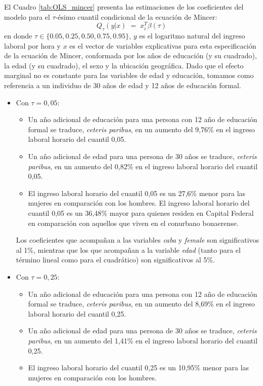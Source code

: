 \documentclass[11pt]{article}
\begin{document}
El Cuadro \ref{tab:OLS_mincer} presenta las estimaciones de los coeficientes del modelo para el $\tau$-ésimo cuantil condicional de la ecuación de Mincer:
\[
Q_{\tau}(y|x)\;=\;x_{i}^{T}\beta(\tau)
\]
en donde $\tau\in\{0.05,0.25,0.50,0.75,0.95\}$, $y$ es el logaritmo natural del ingreso laboral por hora y $x$ es el vector de variables explicativas para esta especificación de la ecuación de Mincer, conformada por los años de educación (y su cuadrado), la edad (y su cuadrado), el sexo y la ubicación geográfica. Dado que el efecto marginal no es constante para las variables de edad y educación, tomamos como referencia a un individuo de 30 años de edad y 12 años de educación formal.
\begin{itemize}
    \item Con $\tau=0,05$:
    \begin{itemize}
        \item Un año adicional de educación para una persona con 12 año de educación formal se traduce, \emph{ceteris paribus}, en un aumento del 9,76\% en el ingreso laboral horario del cuantil 0,05.
        \item Un año adicional de edad para una persona de 30 años se traduce, \emph{ceteris paribus}, en un aumento del 0,82\% en el ingreso laboral horario del cuantil 0,05.
        \item El ingreso laboral horario del cuantil 0,05 es un 27,6\% menor para las mujeres en comparación con los hombres.
        El ingreso laboral horario del cuantil 0,05 es un 36,48\% mayor para quienes residen en Capital Federal en comparación con aquellos que viven en el conurbano bonaerense.
    \end{itemize}
    Los coeficientes que acompañan a las variables \emph{caba} y \emph{female} son significativos al 1\%, mientras que los que acompañan a la variable \emph{edad} (tanto para el término lineal como para el cuadrático) son significativos al 5\%.
    \item Con $\tau=0,25$:
    \begin{itemize}
        \item Un año adicional de educación para una persona con 12 año de educación formal se traduce, \emph{ceteris paribus}, en un aumento del 8,69\% en el ingreso laboral horario del cuantil 0,25.
        \item Un año adicional de edad para una persona de 30 años se traduce, \emph{ceteris paribus}, en un aumento del 1,41\% en el ingreso laboral horario del cuantil 0,25.
        \item El ingreso laboral horario del cuantil 0,25 es un 10,95\% menor para las mujeres en comparación con los hombres.

\end{itemize}
\end{itemize}
\end{document}
